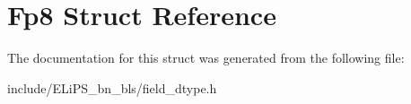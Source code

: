 \hypertarget{struct_fp8}{}\section{Fp8 Struct Reference}
\label{struct_fp8}


The documentation for this struct was generated from the following file\+:\begin{DoxyCompactItemize}
\item 
include/\+E\+Li\+P\+S\+\_\+bn\+\_\+bls/field\+\_\+dtype.\+h\end{DoxyCompactItemize}
